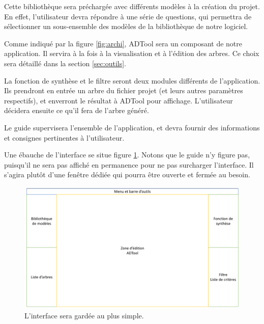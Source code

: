         Cette bibliothèque sera préchargée avec différents modèles à la création du projet. En effet, l'utilisateur devra répondre à une série de questions, qui permettra de sélectionner un sous-ensemble des modèles de la bibliothèque de notre logiciel.

        Comme indiqué par la figure \ref{fig:archi}, ADTool sera un composant de notre application. Il servira à la fois à la visualisation et à l'édition des arbres. Ce choix sera détaillé dans la section \ref{sec:outils}.

        La fonction de synthèse et le filtre seront deux modules différents de l'application. Ils prendront en entrée un arbre du fichier projet (et leurs autres paramètres respectifs), et enverront le résultat à ADTool pour affichage. L'utilisateur décidera ensuite ce qu'il fera de l'arbre généré.

        Le guide supervisera l'ensemble de l'application, et devra fournir des informations et consignes pertinentes à l'utilisateur.

        Une ébauche de l'interface se situe figure \ref{fig:interface}. Notons que le guide n'y figure pas, puisqu'il ne sera pas affiché en permanence pour ne pas surcharger l'interface. Il s'agira plutôt d'une fenêtre dédiée qui pourra être ouverte et fermée au besoin.

        \begin{figure}
            \begin{center}
                \includegraphics[width=1\textwidth]{figure/interface.pdf}
            \end{center}
            \caption{L'interface sera gardée au plus simple.}
            \label{fig:interface}
        \end{figure}